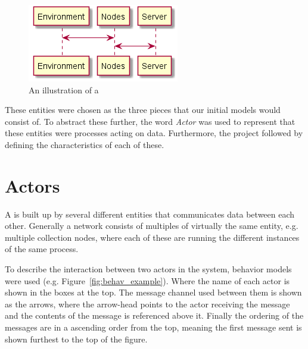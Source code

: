 \begin{figure}[ht]
    \includegraphics{include/figures/basic_wsn}
    \caption{An illustration of a \wsn}
    \label{fig:basic_wsn}
\end{figure}

These entities were chosen as the three pieces that our initial models would consist of. To abstract these further, the word \textit{Actor} was used to represent that these entities were processes acting on data. Furthermore, the project followed by defining the characteristics of each of these.  





\section{Actors}

A \wsn is built up by several different entities that communicates data between each other. Generally a network consists of multiples of virtually the same entity, e.g. multiple collection nodes, where each of these are running the different instances of the same process. %

To describe the interaction between two actors in the system, behavior models were used (e.g. Figure~\ref{fig:behav_example}). Where the name of each actor is shown in the boxes at the top. The message channel used between them is shown as the arrows, where the arrow-head points to the actor receiving the message and the contents of the message is referenced above it. Finally the ordering of the messages are in a ascending order from the top, meaning the first message sent is shown furthest to the top of the figure.

